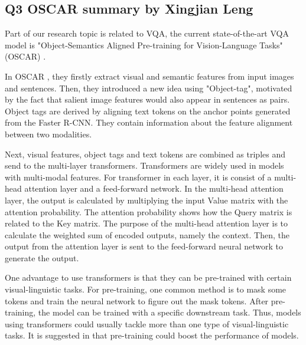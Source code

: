 \documentclass[12pt, a4paper]{article}
\begin{document}
\subsection*{Q3 OSCAR summary by Xingjian Leng}
\par\noindent \newline Part of our research topic is related to VQA, the current state-of-the-art VQA model is "Object-Semantics Aligned Pre-training for Vision-Language Tasks" (OSCAR) \cite{DBLP:journals/corr/abs-2004-06165}.

\par\noindent \newline In OSCAR \cite{DBLP:journals/corr/abs-2004-06165}, they firstly extract visual and semantic features from input images and sentences. Then, they introduced a new idea using "Object-tag", motivated by the fact that salient image features would also appear in sentences as pairs. Object tags are derived by aligning text tokens on the anchor points generated from the Faster R-CNN. They contain information about the feature alignment between two modalities. 

\par\noindent \newline Next, visual features, object tags and text tokens are combined as triples and send to the multi-layer transformers. Transformers are widely used in models with multi-modal features. For transformer \cite{DBLP:journals/corr/VaswaniSPUJGKP17} in each layer, it is consist of a multi-head attention layer and a feed-forward network. In the multi-head attention layer, the output is calculated by multiplying the input Value matrix with the attention probability. The attention probability shows how the Query matrix is related to the Key matrix. The purpose of the multi-head attention layer is to calculate the weighted sum of encoded outputs, namely the context. Then, the output from the attention layer is sent to the feed-forward neural network to generate the output. 

\par\noindent \newline One advantage to use transformers is that they can be pre-trained with certain visual-linguistic tasks. For pre-training, one common method is to mask some tokens and train the neural network to figure out the mask tokens. After pre-training, the model can be trained with a specific downstream task. Thus, models using transformers could usually tackle more than one type of visual-linguistic tasks. It is suggested in \cite{DBLP:journals/corr/abs-2101-11562} that pre-training could boost the performance of models. 
\end{document}
